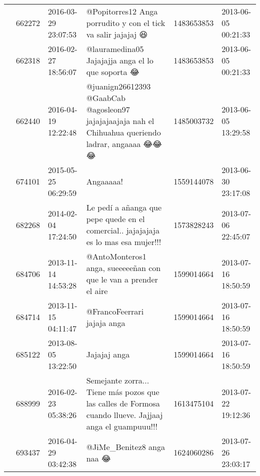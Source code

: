 \begin{tabular}{llllrl}
           & 662272  & 2016-03-29 23:07:53 &                                                                                @Popitorres12 Anga porrudito y con el tick va salir jajajaj 😆 &  1483653853 & 2013-06-05 00:21:33 \\
           & 662318  & 2016-02-27 18:56:07 &                                                                                            @lauramedina05 Jajajajja anga el lo que soporta 😂 &  1483653853 & 2013-06-05 00:21:33 \\
           & 662440  & 2016-04-19 12:22:48 &                                           @juanign26612393 @GaabCab @agosleon97 jajajajaajaja nah el Chihuahua queriendo ladrar, angaaaa 😂😂😂 &  1485003732 & 2013-06-05 13:29:58 \\
           & 674101  & 2015-05-25 06:29:59 &                                                                                                                                    Angaaaaa! &  1559144078 & 2013-06-30 23:17:08 \\
           & 682268  & 2014-02-04 17:24:50 &                                                          Le pedí a añanga que pepe quede en el comercial.. jajajajaja es lo mas esa mujer!!! &  1573828243 & 2013-07-06 22:45:07 \\
           & 684706  & 2013-11-14 14:53:28 &                                                                             @AntoMonteros1 anga, sueeeeeñan con que le van a prender el aire &  1599014664 & 2013-07-16 18:50:59 \\
           & 684714  & 2013-11-15 04:11:47 &                                                                                                                  @FrancoFeerrari jajaja anga &  1599014664 & 2013-07-16 18:50:59 \\
           & 685122  & 2013-08-05 13:22:50 &                                                                                                                                 Jajajaj anga &  1599014664 & 2013-07-16 18:50:59 \\
           & 688999  & 2016-02-23 05:38:26 &                                      Semejante zorra... Tiene más pozos que las calles de Formosa cuando llueve. Jajjaaj anga el guampuuu!!! &  1613475104 & 2013-07-22 19:12:36 \\
           & 693437  & 2016-04-29 03:42:38 &                                                                                                                    @JiMe\_Benitez8 anga naa 😂 &  1624060286 & 2013-07-26 23:03:17 \\

\end{tabular}
